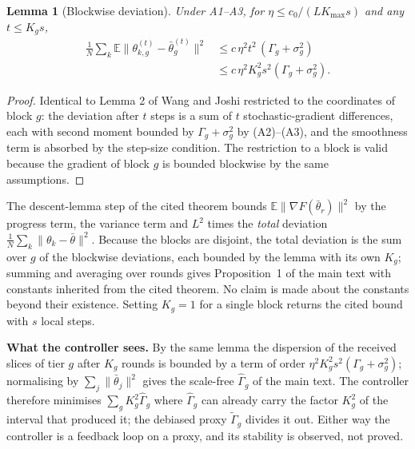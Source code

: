 \documentclass[journal]{IEEEtran}
\newtheorem{lemma}{Lemma}
\begin{document}
\begin{lemma}[Blockwise deviation]
Under A1--A3, for $\eta\le c_0/(LK_{\max}s)$ and any $t\le K_gs$,
\begin{align*}
\frac1N\sum_k\mathbb E\big\|\theta^{(t)}_{k,g}-\bar\theta^{(t)}_g\big\|^2&\le c\,\eta^2 t^2\,(\Gamma_g+\sigma_g^2)\\
&\le c\,\eta^2K_g^2s^2(\Gamma_g+\sigma_g^2).
\end{align*}
\end{lemma}
\begin{proof}
Identical to Lemma 2 of Wang and Joshi restricted to the coordinates of block $g$: the deviation after $t$ steps is a sum of $t$ stochastic-gradient differences, each with second moment bounded by $\Gamma_g+\sigma_g^2$ by (A2)--(A3), and the smoothness term is absorbed by the step-size condition. The restriction to a block is valid because the gradient of block $g$ is bounded blockwise by the same assumptions.
\end{proof}

The descent-lemma step of the cited theorem bounds $\mathbb E\|\nabla F(\bar\theta_r)\|^2$ by the progress term, the variance term and $L^2$ times the \emph{total} deviation $\frac1N\sum_k\|\theta_k-\bar\theta\|^2$. Because the blocks are disjoint, the total deviation is the sum over $g$ of the blockwise deviations, each bounded by the lemma with its own $K_g$; summing and averaging over rounds gives Proposition~1 of the main text with constants inherited from the cited theorem. No claim is made about the constants beyond their existence. Setting $K_g=1$ for a single block returns the cited bound with $s$ local steps.

\textbf{What the controller sees.} By the same lemma the dispersion of the received slices of tier $g$ after $K_g$ rounds is bounded by a term of order $\eta^2K_g^2s^2(\Gamma_g+\sigma_g^2)$; normalising by $\sum_j\|\bar\theta_j\|^2$ gives the scale-free $\hat\Gamma_g$ of the main text. The controller therefore minimises $\sum_g K_g^2\hat\Gamma_g$ where $\hat\Gamma_g$ can already carry the factor $K_g^2$ of the interval that produced it; the debiased proxy $\tilde\Gamma_g$ divides it out. Either way the controller is a feedback loop on a proxy, and its stability is observed, not proved.
\end{document}
